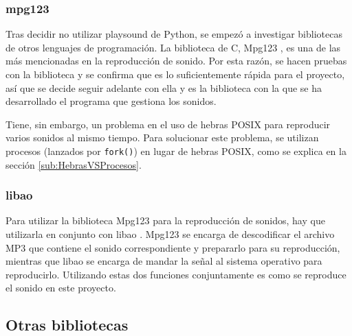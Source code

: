 
            \subsubsection{mpg123} %
            \label{ssub:Mpg123}

                Tras decidir no utilizar playsound de Python, se empezó a investigar bibliotecas de otros lenguajes de
                programación. La biblioteca de C, Mpg123 \cite{mpg123}, es una de las más mencionadas en la reproducción
                de sonido. Por esta razón, se hacen pruebas con la biblioteca y se confirma que es lo suficientemente
                rápida para el proyecto, así que se decide seguir adelante con ella y es la biblioteca con la que se ha
                desarrollado el programa que gestiona los sonidos.

                Tiene, sin embargo, un problema en el uso de hebras POSIX para reproducir varios sonidos al mismo
                tiempo. Para solucionar este problema, se utilizan procesos (lanzados por \texttt{fork()}) en lugar de
                hebras POSIX, como se explica en la sección \ref{sub:HebrasVSProcesos}.


            \subsubsection{libao} %
            \label{ssub:Libao}

                Para utilizar la biblioteca Mpg123 para la reproducción de sonidos, hay que utilizarla en conjunto con
                libao \cite{libao}. Mpg123 se encarga de descodificar el archivo MP3 que contiene el sonido
                correspondiente y prepararlo para su reproducción, mientras que libao se encarga de mandar la señal al
                sistema operativo para reproducirlo. Utilizando estas dos funciones conjuntamente es como se reproduce
                el sonido en este proyecto.



        \subsection{Otras bibliotecas} %
        \label{sub:OtrasLibrerias}

